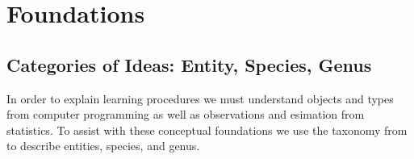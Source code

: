 \chapter{Foundations}

\section{Categories of Ideas: Entity, Species, Genus}

In order to explain learning procedures we must understand objects and types from computer
programming as well as observations and esimation from statistics.  To assist with these
conceptual foundations we use the taxonomy from \cite[Chapter~1,Section~1]{stepanov2009elements}
to describe entities, species, and genus.
